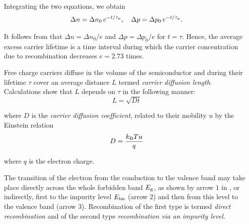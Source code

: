 \noindent
Integrating the two equations, we obtain
\begin{equation}\label{eq:5_50}
    \Delta{n} = \Delta{n}_0\, e^{-t/\tau_{\text{n}}},\quad \Delta{p} = \Delta{p}_0\, e^{-t/\tau_{\text{p}}}.
\end{equation}

\noindent
It follows from  that $\Delta{n}=\Delta{n}_0/e$ and $\Delta{p}=\Delta{p}_0/e$ for $t=\tau$. Hence, the average excess carrier lifetime is a time interval during which the carrier concentration due to recombination decreases $e=2.73$ times.

Free charge carriers diffuse in the volume of the semiconductor and during their lifetime $\tau$ cover an average distance $L$ termed \textit{carrier diffusion length}. Calculations show that $L$ depends on $\tau$ in the following manner:
\begin{equation}\label{eq:5_51}
    L = \sqrt{D t}
\end{equation}

\noindent
where $D$ is the \textit{carrier diffusion coefficient}, related to their mobility $u$ by the Einstein relation
\begin{equation}\label{eq:5_52}
    D = \frac{k_{\text{B}} T u}{q}
\end{equation}

\noindent
where $q$ is the electron charge.

The transition of the electron from the conduction to the valence band may take place directly across the whole forbidden band $E_{\text{g}}$, as shown by arrow $1$ in , or indirectly, first to the impurity level $E_{\text{im}}$ (arrow $2$) and then from this level to the valence band (arrow $3$). Recombination of the first type is termed \textit{direct recombination} and of the second type \textit{recombination via an impurity level}.

